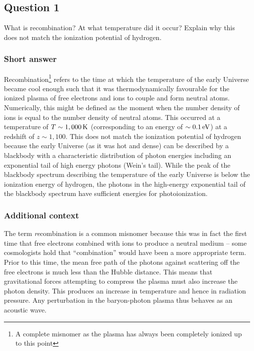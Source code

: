 \documentclass[a4paper,11pt]{article}
\begin{document}
\newpage
\subsection{Question 1}

What is recombination? At what temperature did it occur? Explain why this does not match the ionization potential of hydrogen.

\subsubsection{Short answer}

Recombination\footnote{A complete misnomer as the plasma has always been completely ionized up to this point} refers to the time at which the temperature of the early Universe became cool enough such that it was thermodynamically favourable for the ionized plasma of free electrons and ions to couple and form neutral atoms. Numerically, this might be defined as the moment when the number density of ions is equal to the number density of neutral atoms. This occurred at a temperature of $T \sim 1,000\,{\rm K}$ (corresponding to an energy of $\sim 0.1\,{\rm eV}$) at a redshift of $z \sim 1,100$. This does not match the ionization potential of hydrogen because the early Universe (as it was hot and dense) can be described by a blackbody with a characteristic distribution of photon energies including an exponential tail of high energy photons (Wein's tail). While the peak of the blackbody spectrum describing the temperature of the early Universe is below the ionization energy of hydrogen, the photons in the high-energy exponential tail of the blackbody spectrum have sufficient energies for photoionization.

\subsubsection{Additional context}

The term \textit{re}combination is a common misnomer because this was in fact the first time that free electrons combined with ions to produce a neutral medium -- some cosmologists hold that ``combination'' would have been a more appropriate term. Prior to this time, the mean free path of the photons against scattering
off the free electrons is much less than the Hubble distance.
This means that gravitational forces attempting to compress the
plasma must also increase the photon density. This produces an
increase in temperature and hence in radiation pressure. Any perturbation in the baryon-photon plasma thus behaves as an acoustic
wave.
\end{document}
